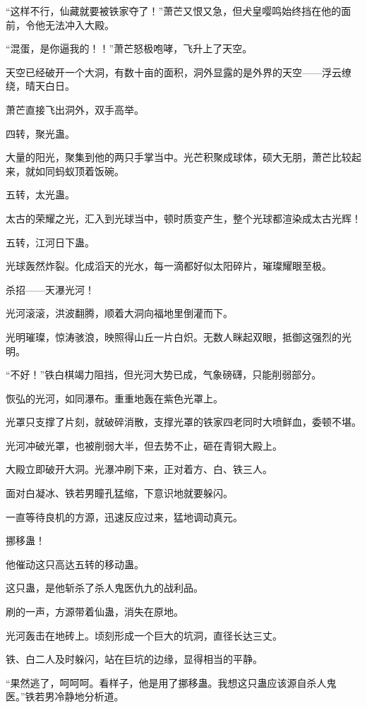 \begin{this_body}
“这样不行，仙藏就要被铁家夺了！”萧芒又恨又急，但犬皇嘤鸣始终挡在他的面前，令他无法冲入大殿。

“混蛋，是你逼我的！！”萧芒怒极咆哮，飞升上了天空。

天空已经破开一个大洞，有数十亩的面积，洞外显露的是外界的天空——浮云缭绕，晴天白日。

萧芒直接飞出洞外，双手高举。

四转，聚光蛊。

大量的阳光，聚集到他的两只手掌当中。光芒积聚成球体，硕大无朋，萧芒比较起来，就如同蚂蚁顶着饭碗。

五转，太光蛊。

太古的荣耀之光，汇入到光球当中，顿时质变产生，整个光球都渲染成太古光辉！

五转，江河日下蛊。

光球轰然炸裂。化成滔天的光水，每一滴都好似太阳碎片，璀璨耀眼至极。

杀招——天瀑光河！

光河滚滚，洪波翻腾，顺着大洞向福地里倒灌而下。

光明璀璨，惊涛骇浪，映照得山丘一片白炽。无数人眯起双眼，抵御这强烈的光明。

“不好！”铁白棋竭力阻挡，但光河大势已成，气象磅礴，只能削弱部分。

恢弘的光河，如同瀑布。重重地轰在紫色光罩上。

光罩只支撑了片刻，就破碎消散，支撑光罩的铁家四老同时大喷鲜血，委顿不堪。

光河冲破光罩，也被削弱大半，但去势不止，砸在青铜大殿上。

大殿立即破开大洞。光瀑冲刷下来，正对着方、白、铁三人。

面对白凝冰、铁若男瞳孔猛缩，下意识地就要躲闪。

一直等待良机的方源，迅速反应过来，猛地调动真元。

挪移蛊！

他催动这只高达五转的移动蛊。

这只蛊，是他斩杀了杀人鬼医仇九的战利品。

刷的一声，方源带着仙蛊，消失在原地。

光河轰击在地砖上。顷刻形成一个巨大的坑洞，直径长达三丈。

铁、白二人及时躲闪，站在巨坑的边缘，显得相当的平静。

“果然逃了，呵呵呵。看样子，他是用了挪移蛊。我想这只蛊应该源自杀人鬼医。”铁若男冷静地分析道。


\end{this_body}
